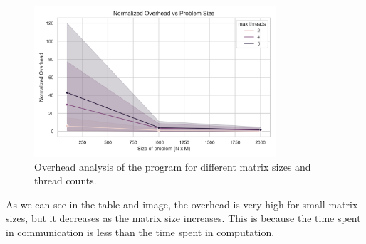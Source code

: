 \documentclass[12pt]{article}
\begin{document}
\begin{figure}[h!]
	\centering
	\includegraphics[width=0.8\textwidth]{normalized_overhead.png}
	\caption{Overhead analysis of the program for different matrix sizes and thread counts.}
	\label{fig:overhead_plot}
\end{figure}
\noindent
As we can see in the table and image, the overhead is very high for small matrix sizes, but it decreases as the matrix size increases. This is because the time spent in communication is less than the time spent in computation.
\end{document}
